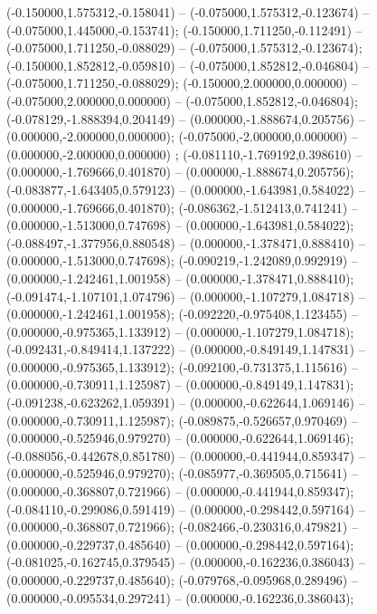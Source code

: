  (-0.150000,1.575312,-0.158041) -- (-0.075000,1.575312,-0.123674) -- (-0.075000,1.445000,-0.153741);
 (-0.150000,1.711250,-0.112491) -- (-0.075000,1.711250,-0.088029) -- (-0.075000,1.575312,-0.123674);
 (-0.150000,1.852812,-0.059810) -- (-0.075000,1.852812,-0.046804) -- (-0.075000,1.711250,-0.088029);
 (-0.150000,2.000000,0.000000) -- (-0.075000,2.000000,0.000000) -- (-0.075000,1.852812,-0.046804);
 (-0.078129,-1.888394,0.204149) -- (0.000000,-1.888674,0.205756) -- (0.000000,-2.000000,0.000000);
 (-0.075000,-2.000000,0.000000) -- (0.000000,-2.000000,0.000000) ;
 (-0.081110,-1.769192,0.398610) -- (0.000000,-1.769666,0.401870) -- (0.000000,-1.888674,0.205756);
 (-0.083877,-1.643405,0.579123) -- (0.000000,-1.643981,0.584022) -- (0.000000,-1.769666,0.401870);
 (-0.086362,-1.512413,0.741241) -- (0.000000,-1.513000,0.747698) -- (0.000000,-1.643981,0.584022);
 (-0.088497,-1.377956,0.880548) -- (0.000000,-1.378471,0.888410) -- (0.000000,-1.513000,0.747698);
 (-0.090219,-1.242089,0.992919) -- (0.000000,-1.242461,1.001958) -- (0.000000,-1.378471,0.888410);
 (-0.091474,-1.107101,1.074796) -- (0.000000,-1.107279,1.084718) -- (0.000000,-1.242461,1.001958);
 (-0.092220,-0.975408,1.123455) -- (0.000000,-0.975365,1.133912) -- (0.000000,-1.107279,1.084718);
 (-0.092431,-0.849414,1.137222) -- (0.000000,-0.849149,1.147831) -- (0.000000,-0.975365,1.133912);
 (-0.092100,-0.731375,1.115616) -- (0.000000,-0.730911,1.125987) -- (0.000000,-0.849149,1.147831);
 (-0.091238,-0.623262,1.059391) -- (0.000000,-0.622644,1.069146) -- (0.000000,-0.730911,1.125987);
 (-0.089875,-0.526657,0.970469) -- (0.000000,-0.525946,0.979270) -- (0.000000,-0.622644,1.069146);
 (-0.088056,-0.442678,0.851780) -- (0.000000,-0.441944,0.859347) -- (0.000000,-0.525946,0.979270);
 (-0.085977,-0.369505,0.715641) -- (0.000000,-0.368807,0.721966) -- (0.000000,-0.441944,0.859347);
 (-0.084110,-0.299086,0.591419) -- (0.000000,-0.298442,0.597164) -- (0.000000,-0.368807,0.721966);
 (-0.082466,-0.230316,0.479821) -- (0.000000,-0.229737,0.485640) -- (0.000000,-0.298442,0.597164);
 (-0.081025,-0.162745,0.379545) -- (0.000000,-0.162236,0.386043) -- (0.000000,-0.229737,0.485640);
 (-0.079768,-0.095968,0.289496) -- (0.000000,-0.095534,0.297241) -- (0.000000,-0.162236,0.386043);
